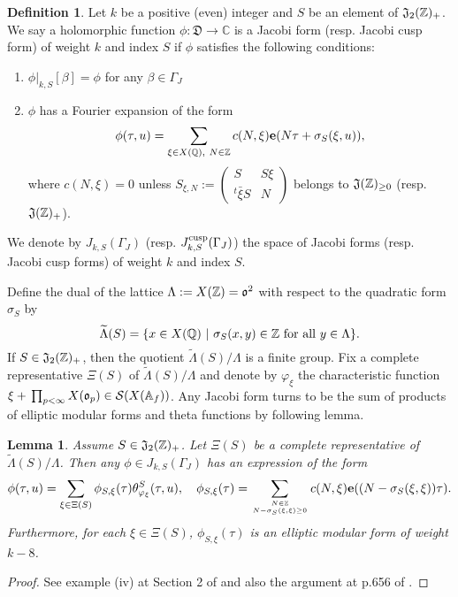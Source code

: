 \documentclass[11pt]{amsart}
\numberwithin{equation}{section}
\newtheorem{lemma}[theorem]{Lemma}
\theoremstyle{definition}
\newtheorem{defin}[theorem]{Definition}
\begin{document}
\begin{defin}\label{jacobi} Let $k$ be a positive (even) integer and $S$ be an element of $\frak J_2({\mathbb{Z}})_+$. 
We say a holomorphic function $\phi:\mathfrak{D}{\longrightarrow} {\mathbb{C}}$ is a Jacobi form (resp. Jacobi cusp form) of weight $k$ and index $S$ if 
$\phi$ satisfies the following conditions:

\begin{enumerate}
\item $\phi|_{k,S}[\beta]=\phi$ for any $\beta\in \Gamma_J$
\item $\phi$ has a Fourier expansion of the form 
$$\phi(\tau,u)=\sum_{\xi\in X({\mathbb{Q}}),\ N\in {\mathbb{Z}}}c(N,\xi)\bold{e}(N\tau+\sigma_S(\xi,u)),
$$
where $c(N,\xi)=0$ unless $S_{\xi,N}:=
\left(\begin{array}{cc}
S & S\xi \\
{}^t \bar{\xi}S & N 
\end{array}\right)$ belongs to $\frak J({\mathbb{Z}})_{\ge 0}$ (resp. $\frak J({\mathbb{Z}})_{+}$).
\end{enumerate}
We denote by $J_{k,S}(\Gamma_J)$ (resp. $J^{{\rm cusp}}_{k,S}(\Gamma_J)$) the space of Jacobi forms 
(resp. Jacobi cusp forms) of weight $k$ and index $S$. 
\end{defin}
Define the dual of the lattice $\Lambda:=X({\mathbb{Z}})=\frak o^2$ with respect to the quadratic form $\sigma_S$ by 
$$\widetilde{\Lambda}(S)=\{x\in X({\mathbb{Q}})\ |\ \sigma_S(x,y)\in {\mathbb{Z}} {\rm \ for\ all}\ y\in \Lambda \}.$$
If $S\in \frak J_2({\mathbb{Z}})_{+}$, then the quotient $\widetilde{\Lambda}(S)/\Lambda$ is a finite group. 
Fix a complete representative $\Xi(S)$ of $\widetilde{\Lambda}(S)/\Lambda$ and denote by 
$\varphi_\xi$ the characteristic function $\xi+{\displaystyle}\prod_{p<\infty}X({\mathfrak{o}}_p)\in \mathcal{S}(X({\mathbb{A}}_f))$. 
Any Jacobi form turns to be the sum of products of elliptic modular forms and 
theta functions by following lemma. 
\begin{lemma}\label{product} Assume $S\in \frak J_2({\mathbb{Z}})_{+}$. 
Let $\Xi(S)$ be a complete representative of $\widetilde{\Lambda}(S)/\Lambda$. Then 
any $\phi\in J_{k,S}(\Gamma_J)$ has an expression of the form 
$$\phi(\tau,u)=\sum_{\xi\in \Xi(S)}\phi_{S,\xi}(\tau) \theta^S_{\varphi_\xi}(\tau,u),\quad 
\phi_{S,\xi}(\tau)=\sum_{N\in {\mathbb{Z}} \atop N-\sigma_S(\xi,\xi)\ge 0}c(N,\xi)\bold{e}((N-\sigma_S(\xi,\xi))\tau).
$$
Furthermore, for each $\xi\in \Xi(S)$,  $\phi_{S,\xi}(\tau)$ is an elliptic modular form of weight $k-8$. 
\end{lemma}
\begin{proof} See example (iv) at Section 2 of \cite{Krieg} and also the argument at p.656 of \cite{Ik1}.  
\end{proof}
\end{document}
